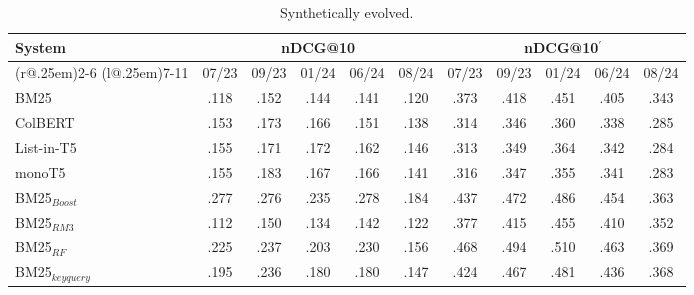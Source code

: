 \begin{table}[t]
\small
\centering
\renewcommand{\tabcolsep}{3.2pt}
\caption{Synthetically evolved.}
\label{tab:table-results-fold}

\begin{tabular}{@{}l@{}cccccccccc@{}}
    \toprule
    \bfseries System & \multicolumn{5}{c}{\bfseries nDCG@10} & \multicolumn{5}{c}{\bfseries nDCG@10$^{'}$}\\
    \cmidrule(r@{.25em}){2-6}
    \cmidrule(l@{.25em}){7-11}
    
    & 07/23 & 09/23 & 01/24 & 06/24 & 08/24 & 07/23 & 09/23 & 01/24 & 06/24 & 08/24\\
    
    \midrule

    BM25 & .118 & .152 & .144 & .141 & .120 & .373 & .418 & .451 & .405 & .343 \\
    ColBERT & .153 & .173 & .166 & .151 & .138 & .314 & .346 & .360 & .338 & .285 \\
    List-in-T5 & .155 & .171 & .172 & .162 & .146 & .313 & .349 & .364 & .342 & .284 \\
    monoT5 & .155 & .183 & .167 & .166 & .141 & .316 & .347 & .355 & .341 & .283 \\
    
    \midrule
    
    BM25$_{Boost}$ & .277 & .276 & .235 & .278 & .184 & .437 & .472 & .486 & .454 & .363 \\
    BM25$_{RM3}$ & .112 & .150 & .134 & .142 & .122 & .377 & .415 & .455 & .410 & .352 \\
    BM25$_{RF}$ & .225 & .237 & .203 & .230 & .156 & .468 & .494 & .510 & .463 & .369 \\
    BM25$_{keyquery}$ & .195 & .236 & .180 & .180 & .147 & .424 & .467 & .481 & .436 & .368 \\

\bottomrule
\end{tabular}
\end{table}
